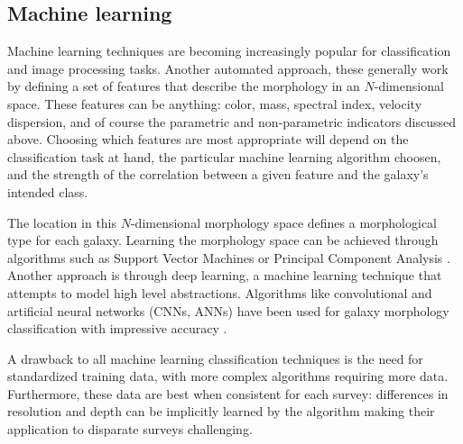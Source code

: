 

\subsection{Machine learning}
Machine learning techniques are becoming increasingly popular for classification and image processing tasks. Another automated approach, these generally work by defining a set of features that describe the morphology in an $N$-dimensional space. These features can be anything: color, mass, spectral index, velocity dispersion, and of course the parametric and non-parametric indicators discussed above. Choosing which features are most appropriate will depend on the classification task at hand, the particular machine learning algorithm choosen, and the strength of the correlation between a given feature and the galaxy's intended class. 

The location in this $N$-dimensional morphology space defines a morphological type for each galaxy. Learning the morphology space can be achieved through algorithms such as Support Vector Machines \citep{HuertasCompany2008} or Principal Component Analysis \citep{Watanabe1985, Conselice2006, Scarlata2007, Peth2016}. Another approach is through deep learning, a machine learning technique that attempts to model high level abstractions. Algorithms like convolutional and artificial neural networks (CNNs, ANNs) have been used for galaxy morphology classification with impressive accuracy \citep{Ball2004, 	Banerji2010, Dieleman2015, HuertasCompany2015}. 

A drawback to all machine learning classification techniques is the need for standardized training data, with more complex algorithms requiring more data. Furthermore, these data are best when consistent for each survey: differences in resolution and depth can be implicitly learned by the algorithm making their application to disparate surveys challenging. 


